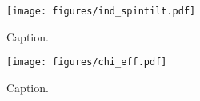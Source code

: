 \begin{figure}
        \texttt{[image: figures/ind\_spintilt.pdf]}
        \caption{Caption.}
        \label{fig:ind_spintilt_dist}
\end{figure}


\begin{figure}
    \texttt{[image: figures/chi\_eff.pdf]}
    \caption{Caption.}
    \label{fig:chieff_dist}
\end{figure}